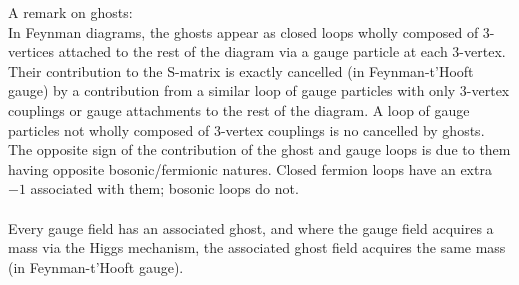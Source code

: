 A remark on ghosts:\\
In Feynman diagrams, the ghosts appear as closed loops wholly composed of $3$-vertices attached to the rest of the diagram via a gauge particle at each $3$-vertex. Their contribution to the S-matrix is exactly cancelled (in Feynman-t'Hooft gauge) by a contribution from a similar loop of gauge particles with only $3$-vertex couplings or gauge attachments to the rest of the diagram. A loop of gauge particles not wholly composed of $3$-vertex couplings is no cancelled by ghosts. The opposite sign of the contribution of the ghost and gauge loops is due to them having opposite bosonic/fermionic natures. Closed fermion loops have an extra $-1$ associated with them; bosonic loops do not.\\
\\
Every gauge field has an associated ghost, and where the gauge field acquires a mass via the Higgs mechanism, the associated ghost field acquires the same mass (in Feynman-t'Hooft gauge).







